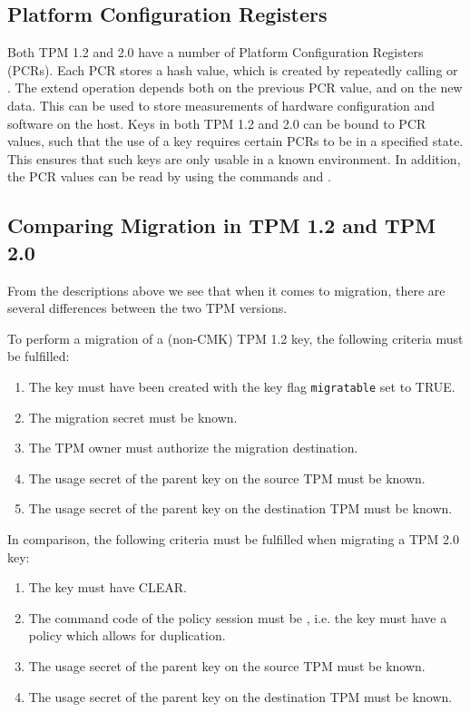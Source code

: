 {\subsection{Platform Configuration Registers} \label{sec:pcrs}
Both TPM 1.2 and 2.0 have a number of Platform Configuration Registers (PCRs). Each PCR stores a hash value, which is created by repeatedly calling  or . The extend operation depends both on the previous PCR value, and on the new data. This can be used to store measurements of hardware configuration and software on the host. Keys in both TPM 1.2 and 2.0 can be bound to PCR values, such that the use of a key requires certain PCRs to be in a specified state. This ensures that such keys are only usable in a known environment. In addition, the PCR values can be read by using the commands  and .

\subsection{Comparing Migration in TPM 1.2 and TPM 2.0}
From the descriptions above we see that when it comes to migration, there are several differences between the two TPM versions.

To perform a migration of a (non-CMK) TPM 1.2 key, the following criteria must be fulfilled:

\begin{enumerate}
	\item The key must have been created with the key flag \texttt{migratable} set to TRUE.
	\item The migration secret must be known.
	\item The TPM owner must authorize the migration destination.
	\item The usage secret of the parent key on the source TPM must be known.
	\item The usage secret of the parent key on the destination TPM must be known.
\end{enumerate}

In comparison, the following criteria must be fulfilled when migrating a TPM 2.0 key:

\begin{enumerate}
	\item The key must have  CLEAR.
	\item The command code of the policy session must be , i.e. the key must have a policy which allows for duplication.
	\item The usage secret of the parent key on the source TPM must be known.
	\item The usage secret of the parent key on the destination TPM must be known.
\end{enumerate}

}
